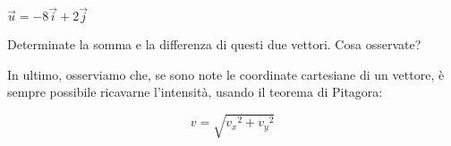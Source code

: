 \begin {center}
\begin {math}
\vec u = -8 \vec i + 2 \vec j
\end{math}
\end{center}
Determinate la somma e la differenza di questi due vettori. Cosa osservate?
\newline

In ultimo, osserviamo che, se sono note le coordinate cartesiane di un vettore, è sempre possibile ricavarne l'intensità, usando il teorema di Pitagora:
\begin{center}
\begin {equation}\label{eq:intensitaDiUnVettore}
v=\sqrt{{v_x}^2+{v_y}^2}
\end{equation}
\end{center}

